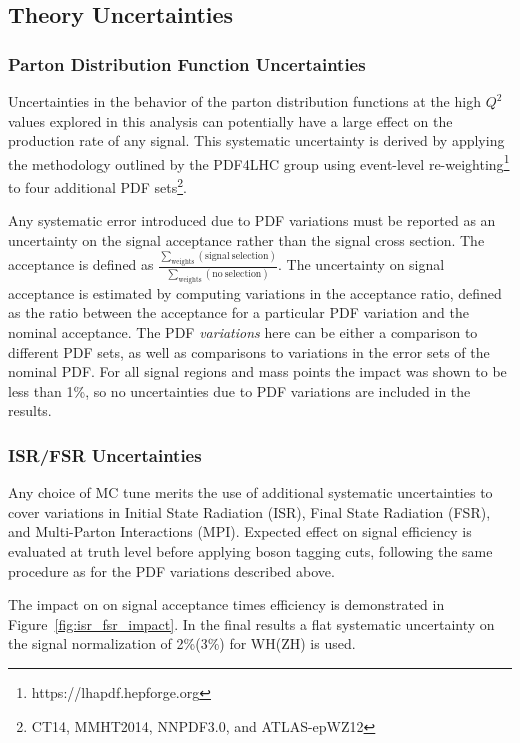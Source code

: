 \subsection{Theory Uncertainties}

\subsubsection{Parton Distribution Function Uncertainties}
\label{sec:pdf_unc}
Uncertainties in the behavior of the parton distribution functions at the high $Q^2$ values explored in this analysis can potentially have a large effect on the production rate of any signal.
This systematic uncertainty is derived by applying the methodology outlined by the PDF4LHC group using event-level re-weighting\footnote{https://lhapdf.hepforge.org} to four additional PDF sets\footnote{CT14, MMHT2014, NNPDF3.0, and ATLAS-epWZ12}.

Any systematic error introduced due to PDF variations must be reported as an uncertainty on the signal acceptance rather than the signal cross section. The acceptance is defined as
$\frac{\sum_{\mathrm{weights}} (\mathrm{signal\ selection})}{\sum_{\mathrm{weights}} (\mathrm{no\ selection})}$.
The uncertainty on signal acceptance is estimated by computing variations in the acceptance ratio, defined as the ratio between the acceptance for a particular PDF variation and the nominal acceptance.
The PDF \textit{variations} here can be either a comparison to different PDF sets, as well as comparisons to variations in the error sets of the nominal PDF.
For all signal regions and mass points the impact was shown to be less than 1\%, so no uncertainties due to PDF variations are included in the results.

\subsubsection{ISR/FSR Uncertainties}

Any choice of MC tune merits the use of additional systematic uncertainties to cover variations in Initial State Radiation (ISR), Final State Radiation (FSR), and Multi-Parton Interactions (MPI).
Expected effect on signal efficiency is evaluated at truth level before applying boson tagging cuts, following the same procedure as for the PDF variations described above.

The impact on on signal acceptance times efficiency is demonstrated in Figure~\ref{fig:isr_fsr_impact}.
In the final results a flat systematic uncertainty on the signal normalization of 2\%(3\%) for WH(ZH) is used.


